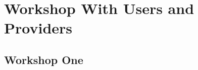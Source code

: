 \chapter{Workshop With Users and Providers}

\section{Workshop One}
\label{workshop_one}

\cleardoublepage